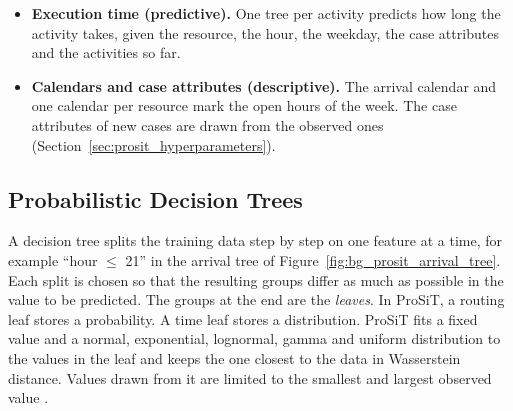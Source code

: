 \begin{itemize}[itemsep=3pt,topsep=4pt]
became enabled. The second is the moment the resource became completely free. Waiting caused
by a busy resource is therefore not part of what the tree learns. The simulator
produces this waiting itself, through the capacity check during the execution
(Section~\ref{sec:prosit_execution}). If the workload features are switched on,
the tree can also react to how busy the resource is
(Section~\ref{sec:prosit_hyperparameters}).
\item \textbf{Execution time (predictive).} One tree per activity predicts how long the
activity takes, given the resource, the hour, the weekday, the case attributes
and the activities so far.
\item \textbf{Calendars and case attributes (descriptive).} The arrival calendar
and one calendar per resource mark the open hours of the week. The case
attributes of new cases are drawn from the observed ones
(Section~\ref{sec:prosit_hyperparameters}).
\end{itemize}

  \subsection{Probabilistic Decision Trees}
\label{sec:prosit_trees}

A decision tree splits the training data step by step on one feature at a time,
for example ``hour $\le$ 21'' in the arrival tree of
Figure~\ref{fig:bg_prosit_arrival_tree}. Each split is chosen so that the
resulting groups differ as much as possible in the value to be predicted. The
groups at the end are the \emph{leaves}. In ProSiT, a routing leaf stores a
probability. A time leaf stores a distribution. ProSiT fits a fixed value and a
normal, exponential, lognormal, gamma and uniform distribution to the values in
the leaf and keeps the one closest to the data in Wasserstein distance. Values
drawn from it are limited to the smallest and largest observed value
\cite{Vinci2026prosit}.

